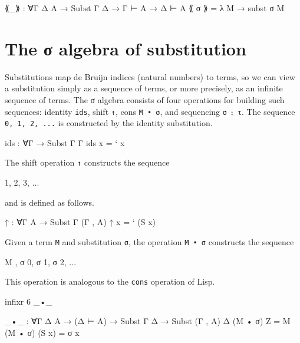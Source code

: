 \begin{fence}
\begin{code}
⟪_⟫ : ∀{Γ Δ A} → Subst Γ Δ → Γ ⊢ A → Δ ⊢ A
⟪ σ ⟫ = λ M → subst σ M
\end{code}
\end{fence}

\hypertarget{the-ux3c3-algebra-of-substitution}{%
\section{The σ algebra of
substitution}\label{the-ux3c3-algebra-of-substitution}}

Substitutions map de Bruijn indices (natural numbers) to terms, so we
can view a substitution simply as a sequence of terms, or more
precisely, as an infinite sequence of terms. The σ algebra consists of
four operations for building such sequences: identity \texttt{ids},
shift \texttt{↑}, cons \texttt{M\ •\ σ}, and sequencing
\texttt{σ\ ⨟\ τ}. The sequence \texttt{0,\ 1,\ 2,\ ...} is constructed
by the identity substitution.

\begin{fence}
\begin{code}
ids : ∀{Γ} → Subst Γ Γ
ids x = ` x
\end{code}
\end{fence}

The shift operation \texttt{↑} constructs the sequence

\begin{myDisplay}
1, 2, 3, ...
\end{myDisplay}

and is defined as follows.

\begin{fence}
\begin{code}
↑ : ∀{Γ A} → Subst Γ (Γ , A)
↑ x = ` (S x)
\end{code}
\end{fence}

Given a term \texttt{M} and substitution \texttt{σ}, the operation
\texttt{M\ •\ σ} constructs the sequence

\begin{myDisplay}
M , σ 0, σ 1, σ 2, ...
\end{myDisplay}

This operation is analogous to the \texttt{cons} operation of Lisp.

\begin{fence}
\begin{code}
infixr 6 _•_

_•_ : ∀{Γ Δ A} → (Δ ⊢ A) → Subst Γ Δ → Subst (Γ , A) Δ
(M • σ) Z = M
(M • σ) (S x) = σ x
\end{code}
\end{fence}

